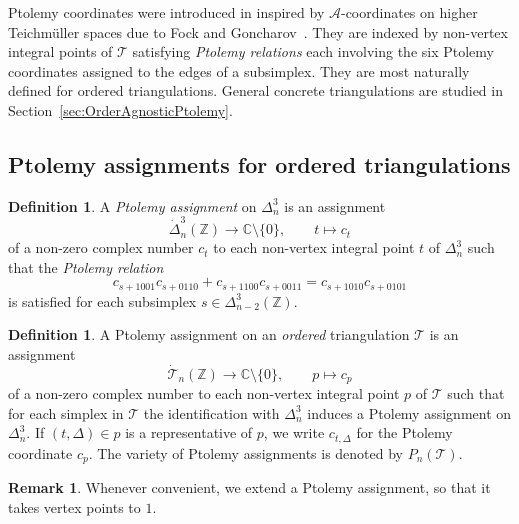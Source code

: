 \documentclass[12pt]{amsart}
\theoremstyle{definition}
\newtheorem{definition}[theorem]{Definition}
\newtheorem{remark}[theorem]{Remark}
\numberwithin{equation}{section}
\def\Z{\mathbb{Z}}
\def\C{\mathbb{C}}
\def\T{\mathcal{T}}
\begin{document}
Ptolemy coordinates were introduced in \cite{GaroufalidisThurstonZickert} inspired by $\mathcal A$-coordinates on higher Teichm\"{u}ller spaces due to Fock and Goncharov~\cite{FockGoncharov}. They are indexed by non-vertex integral points of $\mathcal{T}$ satisfying \emph{Ptolemy relations} each involving the six Ptolemy coordinates assigned to the edges of a subsimplex. They are most naturally defined for ordered triangulations. General concrete triangulations are studied in Section~\ref{sec:OrderAgnosticPtolemy}.

\subsection{Ptolemy assignments for ordered triangulations}
\begin{definition}\label{def:PtolemyAssignment}
A \emph{Ptolemy assignment} on $\Delta^3_n$ is an assignment
\begin{equation}
\dot{\Delta}^3_n(\Z)\to\C\setminus\{0\},\qquad t\mapsto c_t
\end{equation}
of a non-zero complex number $c_t$ to each non-vertex integral point $t$ of $\Delta^3_n$ such that the \emph{Ptolemy relation}
\begin{equation}
c_{s+1001}c_{s+0110}+c_{s+1100}c_{s+0011}=c_{s+1010}c_{s+0101}\label{eqn:PtolemyRelation}
\end{equation}
is satisfied for each subsimplex $s\in\Delta^3_{n-2}(\Z)$. 
\end{definition}
\begin{definition}\label{def:PtolemyAssignmentOrd}
A Ptolemy assignment on an \emph{ordered} triangulation $\mathcal{T}$ is an assignment
\begin{equation}
\dot{\mathcal{T}}_n(\Z)\to\C\setminus\{0\},\qquad p\mapsto c_p
\end{equation}
of a non-zero complex number to each non-vertex integral point $p$ of $\mathcal{T}$ such that for each simplex in $\mathcal{T}$ the identification with $\Delta^3_n$ induces a Ptolemy assignment on $\Delta^3_n$. If $(t,\Delta)\in p$ is a representative of $p$, we write $c_{t,\Delta}$ for the Ptolemy coordinate $c_p$. The variety of Ptolemy assignments is denoted by $P_n(\T)$.
\end{definition}

\begin{remark}
Whenever convenient, we extend a Ptolemy assignment, so that it takes vertex points to $1$.
\end{remark}
\end{document}
